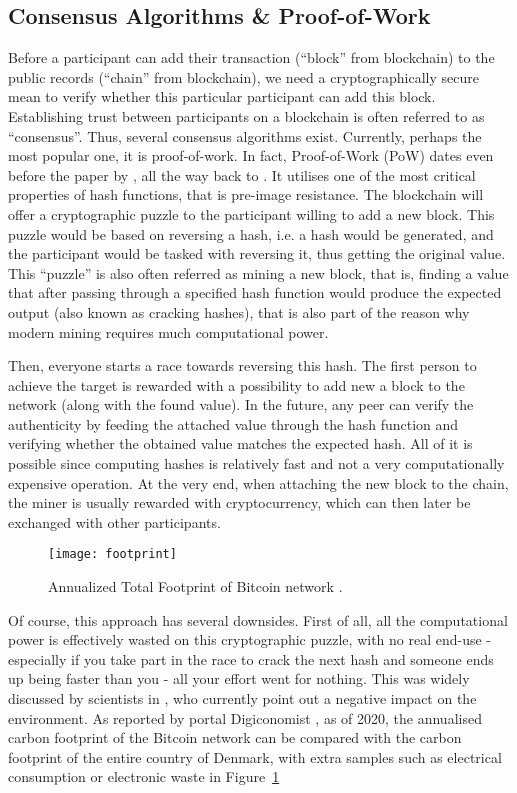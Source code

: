\subsection{Consensus Algorithms \& Proof-of-Work}\label{sec:pow}
Before a participant can add their transaction (``block'' from blockchain) to the public records (``chain'' from blockchain), we need a cryptographically secure mean to verify whether this particular participant can add this block. Establishing trust between participants on a blockchain is often referred to as ``consensus''. Thus, several consensus algorithms exist. Currently, perhaps the most popular one, it is proof-of-work. In fact, Proof-of-Work (PoW) dates even before the paper by \citet{nakamoto2008peer}, all the way back to \citet{jakobsson1999proofs}. It utilises one of the most critical properties of hash functions, that is pre-image resistance. The blockchain will offer a cryptographic puzzle to the participant willing to add a new block. This puzzle would be based on reversing a hash, i.e. a hash would be generated, and the participant would be tasked with reversing it, thus getting the original value. This ``puzzle'' is also often referred as mining a new block, that is, finding a value that after passing through a specified hash function would produce the expected output (also known as cracking hashes), that is also part of the reason why modern mining requires much computational power. 

Then, everyone starts a race towards reversing this hash. The first person to achieve the target is rewarded with a possibility to add new a block to the network (along with the found value). In the future, any peer can verify the authenticity by feeding the attached value through the hash function and verifying whether the obtained value matches the expected hash. All of it is possible since computing hashes is relatively fast and not a very computationally expensive operation. At the very end, when attaching the new block to the chain, the miner is usually rewarded with cryptocurrency, which can then later be exchanged with other participants.

\begin{figure}[ht]
    \centering
    \texttt{[image: footprint]}
    \caption{Annualized Total Footprint of Bitcoin network \cite{index2017digiconomist}.}
    \label{fig:footprint}
\end{figure}

Of course, this approach has several downsides. First of all, all the computational power is effectively wasted on this cryptographic puzzle, with no real end-use - especially if you take part in the race to crack the next hash and someone ends up being faster than you - all your effort went for nothing. This was widely discussed by scientists in \citet{gervais2016security}, who currently point out a negative impact on the environment. As reported by portal Digiconomist \cite{index2017digiconomist}, as of 2020, the annualised carbon footprint of the Bitcoin network can be compared with the carbon footprint of the entire country of Denmark, with extra samples such as electrical consumption or electronic waste in Figure~\ref{fig:footprint}

